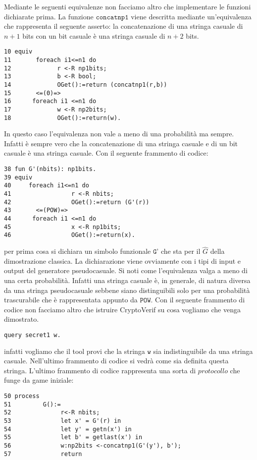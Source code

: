 \documentclass[a4paper,openright,twoside,12pt]{report}
\begin{document}
Mediante le seguenti equivalenze non facciamo altro che implementare le funzioni dichiarate prima.
La funzione $\texttt{concatnp1}$ viene descritta mediante un'equivalenza che rappresenta il seguente asserto:
la concatenazione di una stringa casuale di $n+1$ bits con un bit casuale \`e una stringa casuale di
$n+2$ bits. 
\begin{verbatim}
10 equiv
11       foreach i1<=n1 do
12             r <-R np1bits;
13             b <-R bool;
14             OGet():=return (concatnp1(r,b))
15       <=(0)=>
16      foreach i1 <=n1 do
17             w <-R np2bits;
18             OGet():=return(w).
\end{verbatim} 
In questo caso l'equivalenza non vale a meno di una probabilit\`a ma sempre. Infatti \`e sempre vero che la concatenazione di una stringa casuale e di un bit casuale \`e una stringa casuale.
Con il seguente frammento di codice:
\begin{verbatim}
38 fun G'(nbits): np1bits.
39 equiv
40     foreach i1<=n1 do
41                 r <-R nbits;
42                 OGet():=return (G'(r))
43       <=(POW)=> 
44      foreach i1 <=n1 do
45                 x <-R np1bits;
46                 OGet():=return(x).
\end{verbatim}
per prima cosa si dichiara un simbolo funzionale $\texttt{G'}$ che sta per il $\hat{G}$ della dimostrazione classica. La dichiarazione viene ovviamente con i tipi di input e output del generatore pseudocasuale.
Si noti come l'equivalenza valga a meno di una certa probabilit\`a. Infatti una stringa casuale \`e, in generale, di natura diversa da una stringa pseudocasuale sebbene siano distinguibili solo per una probabilit\`a trascurabile
che \`e rappresentata appunto da $\texttt{POW}$.
Con il seguente frammento di codice non facciamo altro che istruire CryptoVerif su cosa vogliamo che venga dimostrato.
\begin{verbatim}
query secret1 w.
\end{verbatim}
infatti vogliamo che il tool provi che la stringa $\texttt{w}$ sia indistinguibile da una stringa casuale. Nell'ultimo frammento di codice si vedr\`a come sia definita questa stringa.
L'ultimo frammento di codice rappresenta una sorta di $protocollo$ che funge da game iniziale:
\begin{verbatim}
50 process
51         G():=
52              r<-R nbits;
53              let x' = G'(r) in
54              let y' = getn(x') in
55              let b' = getlast(x') in
56              w:np2bits <-concatnp1(G'(y'), b');
57              return
\end{verbatim}
\end{document}
